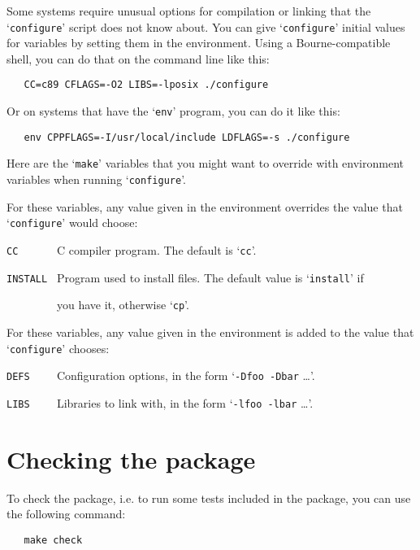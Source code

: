 Some systems require unusual options for compilation or linking that
the `\verb|configure|' script does not know about. You can give
`\verb|configure|' initial values for variables by setting them in the
environment. Using a Bourne-compatible shell, you can do that on the
command line like this:

\begin{verbatim}
   CC=c89 CFLAGS=-O2 LIBS=-lposix ./configure
\end{verbatim}

\noindent
Or on systems that have the `\verb|env|' program, you can do it like
this:

\begin{verbatim}
   env CPPFLAGS=-I/usr/local/include LDFLAGS=-s ./configure
\end{verbatim}

Here are the `\verb|make|' variables that you might want to override
with environment variables when running `\verb|configure|'.

For these variables, any value given in the environment overrides the
value that `\verb|configure|' would choose:

\medskip

\noindent
\verb|CC      | C compiler program. The default is `\verb|cc|'.

\medskip

\noindent
\verb|INSTALL | Program used to install files. The default value is
`\verb|install|' if

\noindent
\verb|        | you have it, otherwise `\verb|cp|'.

\medskip

For these variables, any value given in the environment is added to the
value that `\verb|configure|' chooses:

\medskip

\noindent
\verb|DEFS    | Configuration options, in the form
`\verb|-Dfoo -Dbar| \dots'.

\medskip

\noindent
\verb|LIBS    | Libraries to link with, in the form
`\verb|-lfoo -lbar| \dots'.

\section{Checking the package}

To check the package, i.e. to run some tests included in the package,
you can use the following command:

\begin{verbatim}
   make check
\end{verbatim}

